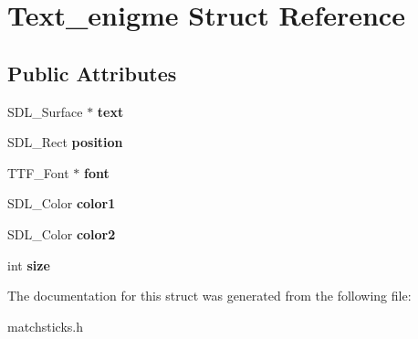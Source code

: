 \hypertarget{structText__enigme}{}\section{Text\+\_\+enigme Struct Reference}
\label{structText__enigme}
\subsection*{Public Attributes}
\begin{DoxyCompactItemize}
\item 
\mbox{\label{structText__enigme_a8e53db4f6d572ee05a3a5394c0b39885}} 
S\+D\+L\+\_\+\+Surface $\ast$ {\bfseries text}
\item 
\mbox{\label{structText__enigme_a1014666a5119f333087f45987558a380}} 
S\+D\+L\+\_\+\+Rect {\bfseries position}
\item 
\mbox{\label{structText__enigme_aa6db3ad23e6a0b80e973cfdd4f8c45a7}} 
T\+T\+F\+\_\+\+Font $\ast$ {\bfseries font}
\item 
\mbox{\label{structText__enigme_a281b95feb122066eedf8fd62bf728070}} 
S\+D\+L\+\_\+\+Color {\bfseries color1}
\item 
\mbox{\label{structText__enigme_a0134c22d777c58b8025445de627e5b16}} 
S\+D\+L\+\_\+\+Color {\bfseries color2}
\item 
\mbox{\label{structText__enigme_a716eb1e88e41e1679ee0b94c89f2b861}} 
int {\bfseries size}
\end{DoxyCompactItemize}


The documentation for this struct was generated from the following file\+:\begin{DoxyCompactItemize}
\item 
matchsticks.\+h\end{DoxyCompactItemize}
